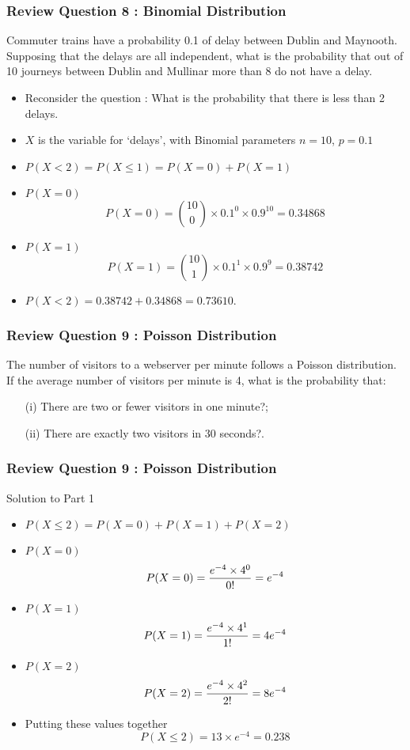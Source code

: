 \begin{frame}
\frametitle{Review Question 8 :  Binomial Distribution}
Commuter trains have a probability 0.1 of delay
between Dublin and Maynooth. Supposing that the delays are all independent,
what is the probability that out of 10 journeys between Dublin and
Mullinar more than 8 do not have a delay.
\begin{itemize}
\item Reconsider the question : What is the probability that there is less than 2 delays.
\item $X$ is the variable for `delays', with Binomial parameters $n=10$, $p=0.1$
\item $P(X < 2) = P(X \leq 1) = P(X=0)+P(X=1)$
\item $P(X=0)$
\[P(X=0)= {10 \choose 0} \times 0.1^0  \times 0.9^10 = 0.34868\]
\item $P(X=1)$
\[P(X=1)= {10 \choose 1} \times 0.1^1  \times 0.9^9 = 0.38742\]
\item $P(X < 2) = 0.38742 + 0.34868 = 0.73610.$
\end{itemize}
\end{frame}
\begin{frame}
\frametitle{Review Question 9 :  Poisson Distribution}
The number of visitors to a webserver per minute follows a Poisson
distribution. If the average number of visitors per minute is 4,
what is the probability that:
\begin{itemize}
\item[(i)] There are two or fewer visitors in one minute?;
\item[(ii)] There are exactly two visitors in 30 seconds?.
\end{itemize}


\end{frame}
\begin{frame}
\frametitle{Review Question 9 :  Poisson Distribution}
Solution to Part 1
\begin{itemize}
\item $P(X\leq 2) = P(X = 0) + P(X = 1) + P(X = 2)$
\item $P(X = 0)$
 \[P(X = 0) = { e^{-4} \times 4^0\over 0!} = e^{-4}\]
\item $P(X = 1)$
\[P(X = 1) = { e^{-4} \times 4^1\over 1!} = 4e^{-4}\]
\item $P(X = 2)$
\[P(X = 2) = { e^{-4} \times 4^2\over 2!} = 8e^{-4}\]
\item Putting these values together
\[P(X\leq 2) = 13 \times e^{-4} = 0.238\]
\end{itemize}
\end{frame}

